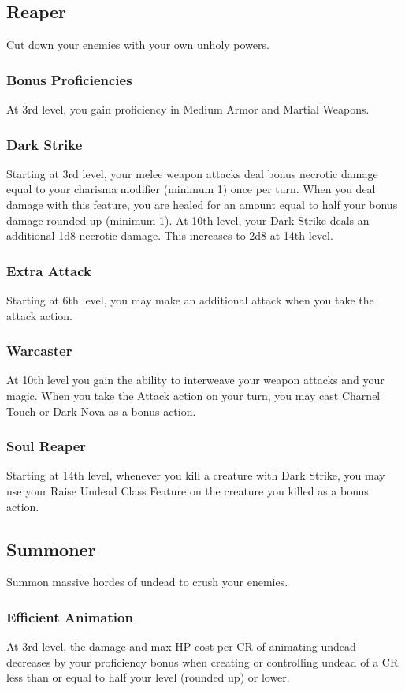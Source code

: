 \documentclass[10pt,twoside,twocolumn,openany]{book}
\begin{document}
\subsection{Reaper}
Cut down your enemies with your own unholy powers.

\subsubsection{Bonus Proficiencies}
At 3rd level, you gain proficiency in Medium Armor and Martial Weapons.

\subsubsection{Dark Strike}
Starting at 3rd level, your melee weapon attacks deal bonus necrotic damage equal to your charisma modifier (minimum 1) once per turn. When you deal damage with this feature, you are healed for an amount equal to half your bonus damage rounded up (minimum 1).
At 10th level, your Dark Strike deals an additional 1d8 necrotic damage. This increases to 2d8 at 14th level.

\subsubsection{Extra Attack}
Starting at 6th level, you may make an additional attack when you take the attack action.
\subsubsection{Warcaster}
At 10th level you gain the ability to interweave your weapon attacks and your magic. When you take the Attack action on your turn, you may cast Charnel Touch or Dark Nova as a bonus action.
\subsubsection{Soul Reaper}
Starting at 14th level, whenever you kill a creature with Dark Strike, you may use your Raise Undead Class Feature on the creature you killed as a bonus action.


\subsection{Summoner}
Summon massive hordes of undead to crush your enemies.

\subsubsection{Efficient Animation}
At 3rd level, the damage and max HP cost per CR of animating undead decreases by your proficiency bonus when creating or controlling undead of a CR less than or equal to half your level (rounded up) or lower.
\end{document}
